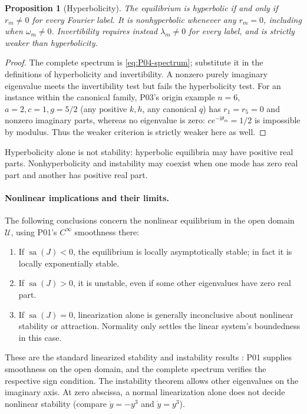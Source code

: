 \documentclass[11pt]{article}
\let\OriginalCite\cite
\renewcommand{\cite}[2][]{%
  \textcolor{CitationRed}{%
    \if\relax\detokenize{#1}\relax
      \OriginalCite{#2}%
    \else
      \OriginalCite[#1]{#2}%
    \fi}}
\newcommand{\ii}{\mathrm{i}}
\newcommand{\Domain}{\mathcal{U}}
\DeclareMathOperator{\sa}{sa}
\newtheorem{proposition}[theorem]{Proposition}
\theoremstyle{definition}
\theoremstyle{remark}
\begin{document}
\begin{proposition}[Hyperbolicity]
\label{prop:P04-hyperbolicity}
The equilibrium is hyperbolic if and only if $r_m\ne0$ for every
Fourier label. It is nonhyperbolic whenever any $r_m=0$, including
when $\omega_m\ne0$. Invertibility requires instead
$\lambda_m\ne0$ for every label, and is strictly weaker than
hyperbolicity.
\end{proposition}
\begin{proof}
The complete spectrum is \eqref{eq:P04-spectrum}; substitute it in
the definitions of hyperbolicity and invertibility. A nonzero purely
imaginary eigenvalue meets the invertibility test but fails the
hyperbolicity test. For an instance within the canonical family,
P03's origin example $n=6$, $a=2,c=1,g=5/2$ (any positive $k,h$,
any canonical $q$) has $r_1=r_5=0$ and nonzero imaginary parts,
whereas no eigenvalue is zero: $ce^{-\ii\theta_m}=1/2$ is impossible
by modulus. Thus the weaker criterion is strictly weaker here as well.
\end{proof}
Hyperbolicity alone is not stability: hyperbolic equilibria may have
positive real parts. Nonhyperbolicity and instability may coexist
when one mode has zero real part and another has positive real part.

\paragraph{Nonlinear implications and their limits.}
The following conclusions concern the nonlinear equilibrium in the
open domain $\Domain$, using P01's $C^\infty$ smoothness there:
\begin{enumerate}[label=(\roman*),leftmargin=*]
\item If $\sa(J)<0$, the equilibrium is locally asymptotically stable;
in fact it is locally exponentially stable.
\item If $\sa(J)>0$, it is unstable, even if some other eigenvalues
have zero real part.
\item If $\sa(J)=0$, linearization alone is generally inconclusive
about nonlinear stability or attraction. Normality only settles the
linear system's boundedness in this case.
\end{enumerate}

These are the standard linearized stability and instability results
\cite[Ch.~1]{GuckenheimerHolmes1983}: P01 supplies smoothness on the
open domain, and the complete spectrum verifies the respective sign
condition. The instability theorem allows other eigenvalues on the
imaginary axis. At zero abscissa, a normal linearization alone does not
decide nonlinear stability (compare $\dot y=-y^3$ and $\dot y=y^3$).
\end{document}
